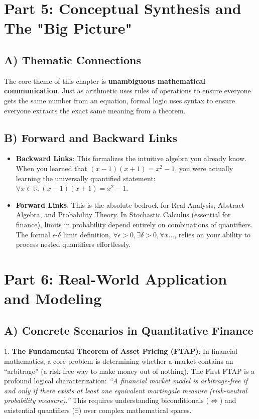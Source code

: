 \documentclass[12pt]{article}
\begin{document}
\section{Part 5: Conceptual Synthesis and The "Big Picture"}

\subsection{A) Thematic Connections}
The core theme of this chapter is \textbf{unambiguous mathematical communication}. Just as arithmetic uses rules of operations to ensure everyone gets the same number from an equation, formal logic uses syntax to ensure everyone extracts the exact same meaning from a theorem. 

\subsection{B) Forward and Backward Links}
\begin{itemize}
    \item \textbf{Backward Links}: This formalizes the intuitive algebra you already know. When you learned that $(x-1)(x+1) = x^2-1$, you were actually learning the universally quantified statement: $\forall x \in \mathbb{R}, (x-1)(x+1) = x^2-1$.
    \item \textbf{Forward Links}: This is the absolute bedrock for Real Analysis, Abstract Algebra, and Probability Theory. In Stochastic Calculus (essential for finance), limits in probability depend entirely on combinations of quantifiers. The formal $\epsilon$-$\delta$ limit definition, $\forall \epsilon > 0, \exists \delta > 0, \forall x \dots$, relies on your ability to process nested quantifiers effortlessly.
\end{itemize}

\section{Part 6: Real-World Application and Modeling}

\subsection{A) Concrete Scenarios in Quantitative Finance}
1. \textbf{The Fundamental Theorem of Asset Pricing (FTAP)}:
In financial mathematics, a core problem is determining whether a market contains an ``arbitrage'' (a risk-free way to make money out of nothing). The First FTAP is a profound logical characterization: \textit{``A financial market model is arbitrage-free if and only if there exists at least one equivalent martingale measure (risk-neutral probability measure).''} This requires understanding biconditionals ($\iff$) and existential quantifiers ($\exists$) over complex mathematical spaces.
\end{document}

